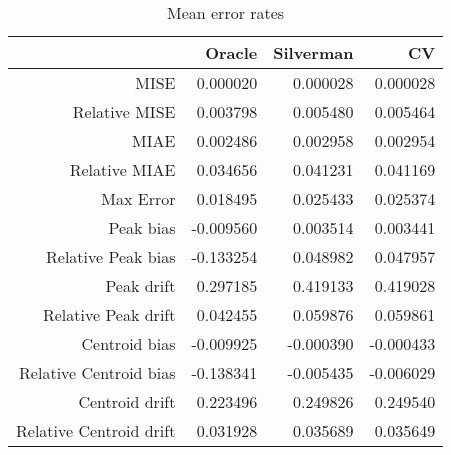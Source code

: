 \begin{table}[ht]
\centering
\begin{tabular}{rrrr}
  \hline
 & Oracle & Silverman & CV \\ 
  \hline
MISE & 0.000020 & 0.000028 & 0.000028 \\ 
  Relative MISE & 0.003798 & 0.005480 & 0.005464 \\ 
  MIAE & 0.002486 & 0.002958 & 0.002954 \\ 
  Relative MIAE & 0.034656 & 0.041231 & 0.041169 \\ 
  Max Error & 0.018495 & 0.025433 & 0.025374 \\ 
  Peak bias & -0.009560 & 0.003514 & 0.003441 \\ 
  Relative Peak bias & -0.133254 & 0.048982 & 0.047957 \\ 
  Peak drift & 0.297185 & 0.419133 & 0.419028 \\ 
  Relative Peak drift & 0.042455 & 0.059876 & 0.059861 \\ 
  Centroid bias & -0.009925 & -0.000390 & -0.000433 \\ 
  Relative Centroid bias & -0.138341 & -0.005435 & -0.006029 \\ 
  Centroid drift & 0.223496 & 0.249826 & 0.249540 \\ 
  Relative Centroid drift & 0.031928 & 0.035689 & 0.035649 \\ 
   \hline
\end{tabular}
\caption{Mean error rates} 
\label{tbl:mean_error_rates}
\end{table}
